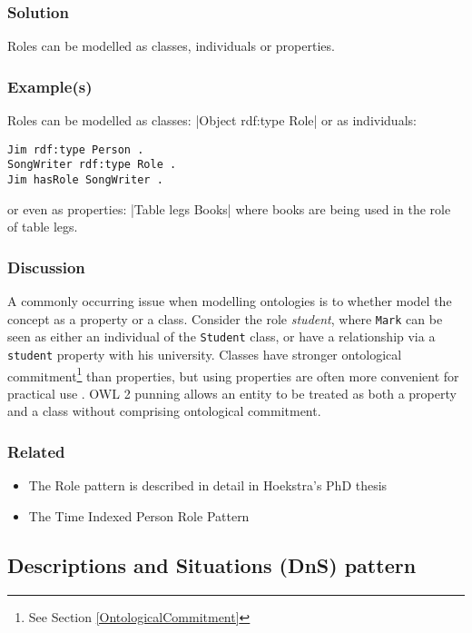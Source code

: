 \subsubsection{Solution}

Roles can be modelled as classes, individuals or properties.

\subsubsection{Example(s)}

Roles can be modelled as classes: |Object rdf:type Role| or as individuals: 
\begin{verbatim}
Jim rdf:type Person .
SongWriter rdf:type Role .
Jim hasRole SongWriter .
\end{verbatim}

\noindent
or even as properties: |Table legs Books| where books are being used in the role of table legs.

\subsubsection{Discussion}

A commonly occurring issue when modelling ontologies is to whether model the concept as a property or a class. Consider the role \emph{student}, where \texttt{Mark} can be seen as either an individual of the \texttt{Student} class, or have a relationship via a \texttt{student} property with his university. Classes have stronger ontological commitment\footnote{See Section \ref{OntologicalCommitment}} than properties, but using properties are often more convenient for practical use \cite{Hoekstra2010}. \ac{OWL} 2 punning allows an entity to be treated as both a property and a class without comprising ontological commitment.

\subsubsection{Related}

\begin{itemize}
	\item The Role pattern is described in detail in Hoekstra's PhD thesis \cite{Hoekstra2009}
	\item The Time Indexed Person Role Pattern \cite{Gangemi2008}
\end{itemize}




\subsection{Descriptions and Situations (DnS) pattern}

